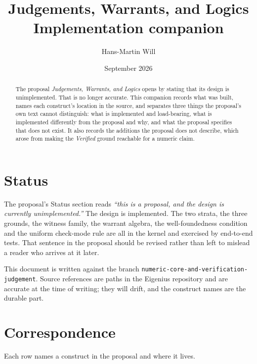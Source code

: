 \documentclass[manuscript,nonacm=true]{acmart}
\newcommand{\code}[1]{\texttt{\small #1}}
\begin{document}
\title[Judgements and Warrants: Implementation]{Judgements, Warrants, and Logics\\[0.5em]
\large Implementation companion}
\author{Hans-Martin Will}
\renewcommand{\shortauthors}{Will}
\date{September 2026}

\begin{abstract}
The proposal \emph{Judgements, Warrants, and Logics} opens by stating that its design is unimplemented. That is no longer accurate. This companion records what was built, names each construct's location in the source, and separates three things the proposal's own text cannot distinguish: what is implemented and load-bearing, what is implemented differently from the proposal and why, and what the proposal specifies that does not exist. It also records the additions the proposal does not describe, which arose from making the \emph{Verified} ground reachable for a numeric claim.
\end{abstract}

\maketitle

\section*{Status}

The proposal's Status section reads \emph{``this is a proposal, and the design is currently unimplemented.''} The design is implemented. The two strata, the three grounds, the witness family, the warrant algebra, the well-foundedness condition and the uniform check-mode rule are all in the kernel and exercised by end-to-end tests. That sentence in the proposal should be revised rather than left to mislead a reader who arrives at it later.

This document is written against the branch \code{numeric-core-and-verification-judgement}. Source references are paths in the Eigenius repository and are accurate at the time of writing; they will drift, and the construct names are the durable part.

\section{Correspondence}

Each row names a construct in the proposal and where it lives.
\end{document}
